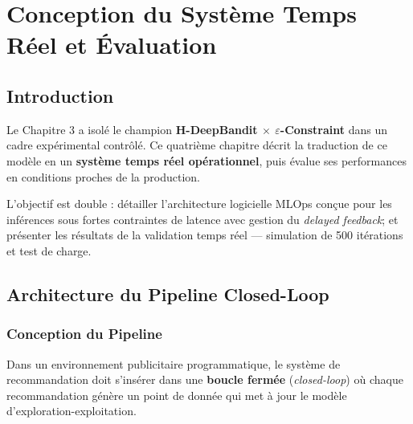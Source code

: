 
\chapter{Conception du Système Temps Réel et Évaluation}
\label{chap:systeme_temps_reel}

\section*{Introduction}

Le Chapitre 3 a isolé le champion \textbf{H-DeepBandit $\times$ $\varepsilon$-Constraint} dans un cadre expérimental contrôlé. Ce quatrième chapitre décrit la traduction de ce modèle en un \textbf{système temps réel opérationnel}, puis évalue ses performances en conditions proches de la production.

L'objectif est double : détailler l'architecture logicielle MLOps conçue pour les inférences sous fortes contraintes de latence avec gestion du \textit{delayed feedback}; et présenter les résultats de la validation temps réel --- simulation de 500 itérations et test de charge.

\section{Architecture du Pipeline Closed-Loop}
\label{sec:architecture_pipeline}

\subsection{Conception du Pipeline}

Dans un environnement publicitaire programmatique, le système de recommandation doit s'insérer dans une \textbf{boucle fermée} (\textit{closed-loop}) où chaque recommandation génère un point de donnée qui met à jour le modèle d'exploration-exploitation.

